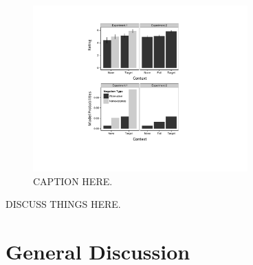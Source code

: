 \documentclass[10pt,letterpaper]{article}
\begin{document}
\begin{figure}
\begin{center} 
\includegraphics[width=3.25in]{figures/modelcomp.pdf}
\caption{\label{fig:modelvdata} CAPTION HERE.}
\end{center} 
\end{figure}

DISCUSS THINGS HERE.

\section{General Discussion}



\setlength{\bibleftmargin}{.125in}
\setlength{\bibindent}{-\bibleftmargin}


\end{document}
